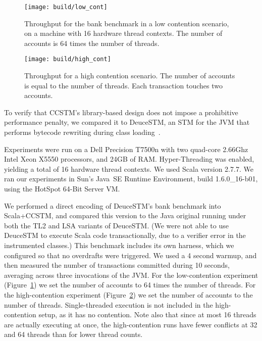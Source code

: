 
\begin{figure}
  \centering \texttt{[image: build/low\_cont]}

\caption{Throughput for the bank benchmark in a low contention scenario,
on a machine with 16 hardware thread contexts.  The number of accounts
is 64 times the number of threads.}

  \label{fig:lowcont}
\end{figure}

\begin{figure}
  \centering \texttt{[image: build/high\_cont]}

\caption{Throughput for a high contention scenario.  The number of accounts is
equal to the number of threads.  Each transaction touches two accounts.}

  \label{fig:highcont}
\end{figure}

To verify that CCSTM's library-based design does not impose a prohibitive
performance penalty, we compared it to DeuceSTM, an STM for the JVM that
performs bytecode rewriting during class loading~\cite{deucestm}.

Experiments were run on a Dell Precision T7500n with two quad-core
2.66Ghz Intel Xeon X5550 processors, and 24GB of RAM.  Hyper-Threading was
enabled, yielding a total of 16 hardware thread contexts.  We used Scala
version 2.7.7.  We ran our experiments in
Sun's Java~SE Runtime Environment, build 1.6.0\_16-b01, using the HotSpot
64-Bit Server VM.

We performed a direct encoding of DeuceSTM's bank benchmark into
Scala+CCSTM, and compared this version to the Java original running under
both the TL2 and LSA variants of DeuceSTM.  (We were not able to use
DeuceSTM to execute Scala code transactionally, due to a verifier error
in the instrumented classes.)  This benchmark includes its own harness,
which we configured so that no overdrafts were triggered.  We used a
4 second warmup, and then measured the number of transactions committed
during 10 seconds, averaging across three invocations of the JVM.  For the
low-contention experiment (Figure~\ref{fig:lowcont}) we set the number
of accounts to 64 times the number of threads.  For the high-contention
experiment (Figure~\ref{fig:highcont}) we set the number of accounts to
the number of threads.  Single-threaded execution is not included in the
high-contention setup, as it has no contention.  Note also that since at most
16 threads are actually executing at once, the high-contention runs have
fewer conflicts at 32 and 64 threads than for lower thread counts.

